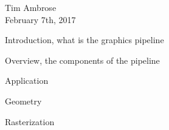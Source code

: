 \documentclass[12pt, oneside]{amsart}
\begin{document}
\raggedright
Tim Ambrose\\
February 7th, 2017\\

\raggedright

\bigskip
Introduction, what is the graphics pipeline

\bigskip
Overview, the components of the pipeline

\bigskip
Application

\bigskip
Geometry

\bigskip
Rasterization
\end{document}
